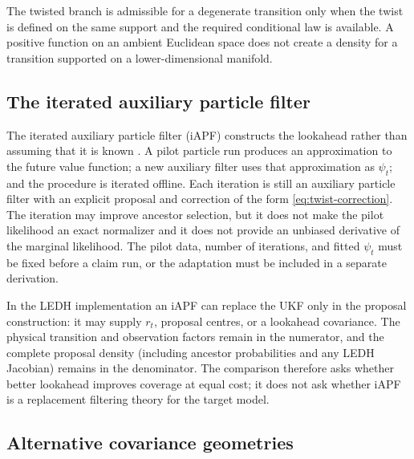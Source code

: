 \documentclass[11pt]{article}
\begin{document}
The twisted branch is admissible for a degenerate transition only when the
twist is defined on the same support and the required conditional law is
available. A positive function on an ambient Euclidean space does not create a
density for a transition supported on a lower-dimensional manifold.

\subsection{The iterated auxiliary particle filter}

The iterated auxiliary particle filter (iAPF) constructs the lookahead rather
than assuming that it is known \citep{guarniero2017iapf}. A pilot particle run
produces an approximation to the future value function; a new auxiliary filter
uses that approximation as $\psi_t$; and the procedure is iterated offline.
Each iteration is still an auxiliary particle filter with an explicit proposal
and correction of the form \eqref{eq:twist-correction}. The iteration may
improve ancestor selection, but it does not make the pilot likelihood an exact
normalizer and it does not provide an unbiased derivative of the marginal
likelihood. The pilot data, number of iterations, and fitted $\psi_t$ must be
fixed before a claim run, or the adaptation must be included in a separate
derivation.

In the LEDH implementation an iAPF can replace the UKF only in the proposal
construction: it may supply $r_t$, proposal centres, or a lookahead covariance.
The physical transition and observation factors remain in the numerator, and
the complete proposal density (including ancestor probabilities and any LEDH
Jacobian) remains in the denominator. The comparison therefore asks whether
better lookahead improves coverage at equal cost; it does not ask whether iAPF
is a replacement filtering theory for the target model.

\subsection{Alternative covariance geometries}
\end{document}
